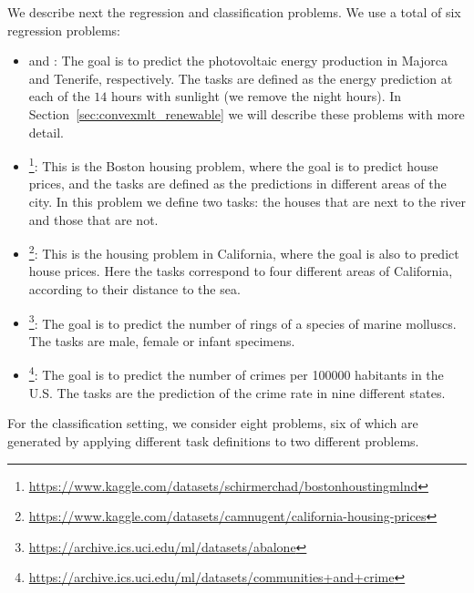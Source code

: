 We describe next the regression and classification problems.
We use a total of six regression problems:
\begin{itemize}
    \item {} and : The goal is to predict the photovoltaic energy production in Majorca and Tenerife, respectively. The tasks are defined as the energy prediction at each of the $14$ hours with sunlight (we remove the night hours). In Section~\ref{sec:convexmlt_renewable} we will describe these problems with more detail.
    \item {}\footnote{\url{https://www.kaggle.com/datasets/schirmerchad/bostonhoustingmlnd}}: This is the Boston housing problem, where the goal is to predict house prices, and the tasks are defined as the predictions in different areas of the city. In this problem we define two tasks: the houses that are next to the river and those that are not. 
    \item {}\footnote{\url{https://www.kaggle.com/datasets/camnugent/california-housing-prices}}: This is the housing problem in California, where the goal is also to predict house prices. Here the tasks correspond to four different areas of California, according to their distance to the sea.
    \item {}\footnote{\url{https://archive.ics.uci.edu/ml/datasets/abalone}}: The goal is to predict the number of rings of a species of marine molluscs. The tasks are male, female or infant specimens.
    \item {}\footnote{\url{https://archive.ics.uci.edu/ml/datasets/communities+and+crime}}: The goal is to predict the number of crimes per \num{100000} habitants in the U.S. The tasks are the prediction of the crime rate in nine different states.
\end{itemize}
For the classification setting, we consider eight problems, six of which are generated by applying different task definitions to two different problems.
